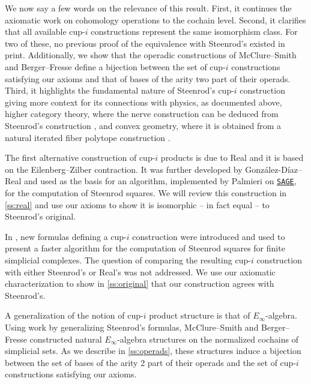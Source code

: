 We now say a few words on the relevance of this result.
First, it continues the axiomatic work on cohomology operations \cite{serre1053eilenberg_maclane, cartan1955iteration, steenrod1962cohomology} to the cochain level.
Second, it clarifies that all available cup-$i$ constructions represent the same isomorphism class.
For two of these, no previous proof of the equivalence with Steenrod's existed in print.
Additionally, we show that the operadic constructions of McClure--Smith \cite{mcclure2003multivariable} and Berger--Fresse \cite{berger2004combinatorial} define a bijection between the set of cup-$i$ constructions satisfying our axioms and that of bases of the arity two part of their operads.
Third, it highlights the fundamental nature of Steenrod's \mbox{cup-$i$} construction giving more context for its connections with physics, as documented above, higher category theory, where the nerve construction can be deduced from Steenrod's construction \cite{street1987orientals, medina2020globular}, and convex geometry, where it is obtained from a natural iterated fiber polytope construction \cite{billera1992fiber_polytope, medina2022fib_poly}.

The first alternative construction of \mbox{cup-$i$} products is due to Real \cite{real1996computability} and it is based on the Eilenberg--Zilber contraction.
It was further developed by Gonz\'alez-D\'iaz--Real \cite{gonzalez-diaz1999steenrod} and used as the basis for an algorithm, implemented by Palmieri on \href{https://www.sagemath.org/}{\texttt{SAGE}}, for the computation of Steenrod squares.
We will review this construction in \cref{ss:real} and use our axioms to show it is isomorphic -- in fact equal -- to Steenrod's original.

In \cite{medina2021fast_sq}, new formulas defining a \mbox{cup-$i$} construction were introduced and used to present a faster algorithm for the computation of Steenrod squares for finite simplicial complexes.
The question of comparing the resulting \mbox{cup-$i$} construction with either Steenrod's or Real's was not addressed.
We use our axiomatic characterization to show in \cref{ss:original} that our construction agrees with Steenrod's.

A generalization of the notion of \mbox{cup-$i$} product structure is that of $E_\infty$-algebra.
Using work by \cite[]{benson1998representations} generalizing Steenrod's formulas, McClure--Smith \cite{mcclure2003multivariable} and Berger--Fresse \cite{berger2004combinatorial} constructed natural $E_\infty$-algebra structures on the normalized cochains of simplicial sets.
As we describe in \cref{ss:operads}, these structures induce a bijection between the set of bases of the arity 2 part of their operads and the set of \mbox{cup-$i$} constructions satisfying our axioms.

